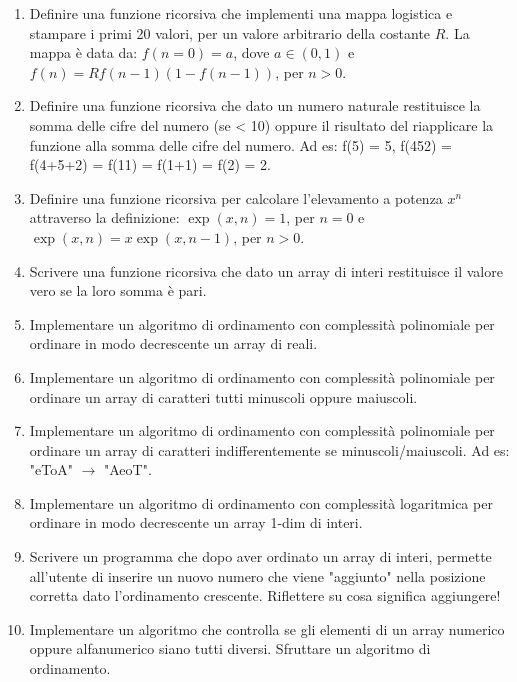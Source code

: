 \documentclass{article}
\begin{document}
\begin{enumerate}
\item Definire una funzione ricorsiva che implementi una mappa logistica e stampare i primi 20 valori, per un valore arbitrario della costante $R$. La mappa è data da: $f(n=0) = a$, dove $a \in (0,1)$ e $f(n) = R f(n-1) (1 - f(n-1))$, per $n>0$.

\item Definire una funzione ricorsiva che dato un numero naturale restituisce la somma delle cifre del numero (se < 10) oppure il risultato del riapplicare la funzione alla somma delle cifre del numero. Ad es: f(5) = 5, f(452) = f(4+5+2) = f(11) = f(1+1) = f(2) = 2.

\item Definire una funzione ricorsiva per calcolare l'elevamento a potenza $x^n$ attraverso la definizione: $\exp(x, n) = 1$, per $n=0$ e $\exp(x, n) = x \exp(x, n-1)$, per $n>0$.

\item Scrivere una funzione ricorsiva che dato un array di interi restituisce il valore vero se la loro somma è pari.

\item Implementare un algoritmo di ordinamento con complessità polinomiale per ordinare in modo decrescente un array di reali.

\item Implementare un algoritmo di ordinamento con complessità polinomiale per ordinare un array di caratteri tutti minuscoli oppure maiuscoli.

\item Implementare un algoritmo di ordinamento con complessità polinomiale per ordinare un array di caratteri indifferentemente se minuscoli/maiuscoli. Ad es: "eToA" $\rightarrow$ "AeoT".

\item Implementare un algoritmo di ordinamento con complessità logaritmica per ordinare in modo decrescente un array 1-dim di interi.

\item Scrivere un programma che dopo aver ordinato un array di interi, permette all'utente di inserire un nuovo numero che viene "aggiunto" nella posizione corretta dato l'ordinamento crescente. Riflettere su cosa significa aggiungere!

\item Implementare un algoritmo che controlla se gli elementi di un array numerico oppure alfanumerico siano tutti diversi. Sfruttare un algoritmo di ordinamento.


\end{enumerate}
\end{document}
